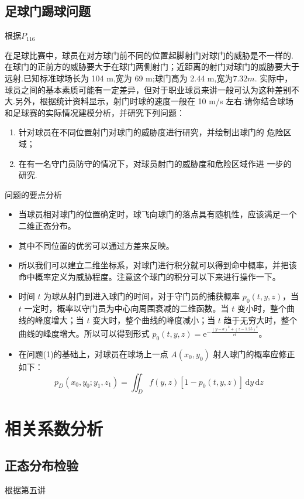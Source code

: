 \documentclass[12pt]{ctexart}
\numberwithin{equation}{section} %
\begin{document}
\subsection{足球门踢球问题}
根据\cite{韩中庚}$P_{116}$
\begin{myex}
  在足球比赛中，球员在对方球门前不同的位置起脚射门对球门的威胁是不一样的.在球门的正前方的威胁要大于在球门两侧射门；近距离的射门对球门的威胁要大于远射.已知标准球场长为 104 m,宽为 69 m;球门高为 2.44 m,宽为$7.32m.$
实际中，球员之间的基本素质可能有一定差异，但对于职业球员来讲一般可认为这种差别不大.另外，根据统计资料显示，射门时球的速度一般在 10 m/s 左右.请你结合球场和足球赛的实际情况建模分析，并研究下列问题：
\begin{enumerate}
\item 针对球员在不同位置射门对球门的威胁度进行研究，并绘制出球门的
危险区域；
\item 在有一名守门员防守的情况下，对球员射门的威胁度和危险区域作进
一步的研究.
\end{enumerate}

\end{myex}
问题的要点分析
\begin{itemize}
  \item 当球员相对球门的位置确定时，球飞向球门的落点具有随机性，应该满足一个二维正态分布。
  \item 其中不同位置的优劣可以通过方差来反映。
  \item 所以我们可以建立二维坐标系，对球门进行积分就可以得到命中概率，并把该命中概率定义为威胁程度。注意这个球门的积分可以下来进行操作一下。
  \item 时间 $t$ 为球从射门到进入球门的时间，对于守门员的捕获概率 $p_{0}(t,y,z)$，当 $t$ 一定时，概率以守门员为中心向周围衰减的二维函数。当 $t$ 变小时，整个曲线的峰度增大；当 $t$ 变大时，整个曲线的峰度减小；当 $t$ 趋于无穷大时，整个曲线的峰度增大。所以可以得到形式 $p_{0}(t,y,z) = \mathrm{e}^{-\frac{(y-a)^{2}+(z-1.25)^{2}}{ct}}$。
  \item 在问题(1)的基础上，对球员在球场上一点 $A(x_{0},y_{0})$ 射人球门的概率应修正如下：
  $$ p_{D}(x_{0},y_{0};y_{1},z_{1}) = \iint_{D} f(y,z) [1 - p_{0}(t,y,z)] \, \mathrm{d}y \, \mathrm{d}z $$
\end{itemize}
\section{相关系数分析}
\subsection{正态分布检验}
根据\cite{清风}第五讲
\end{document}
